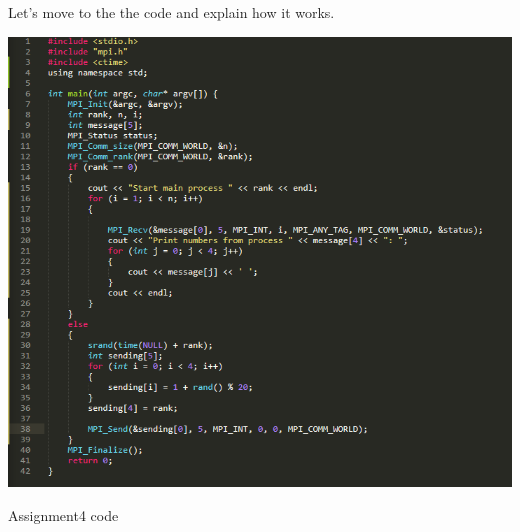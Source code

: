 \documentclass[%
12pt, %
final, %
oneside, %
onecolumn, %
centertags]{article} %
\theoremstyle{plain}
\theoremstyle{definition}
\theoremstyle{remark}
\begin{document}
Let's move to the the code and explain how it works.

\begin{center}
		\includegraphics[scale=0.75]{4.code.png}

		Assignment4 code
\end{center}
\end{document}
